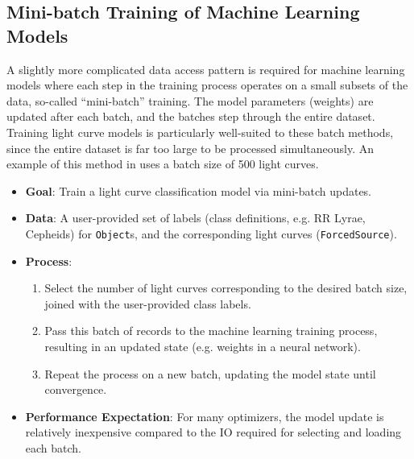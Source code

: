 \documentclass[DM,authoryear,toc]{lsstdoc}
\begin{document}
\subsection{Mini-batch Training of Machine Learning Models}

A slightly more complicated data access pattern is required for machine learning
models where each step in the training process operates on a small subsets of
the data, so-called ``mini-batch'' training. The model parameters (weights) are
updated after each batch, and the batches step through the entire dataset.
Training light curve models is
particularly well-suited to these batch methods, since the entire dataset is far
too large to be processed simultaneously. An example of this method in
\citet{2018NatAs...2..151N} uses a batch size of 500 light curves.

\begin{itemize}
  \item \textbf{Goal}: Train a light curve classification model via mini-batch updates.
  \item \textbf{Data}: A user-provided set of labels (class definitions, e.g. RR
  Lyrae, Cepheids) for \texttt{Object}s, and the corresponding light curves
  (\texttt{ForcedSource}).
  \item \textbf{Process}:
  \begin{enumerate}
    \item Select the number of light curves corresponding to the desired batch
    size, joined with the user-provided class labels.
    \item Pass this batch of records to the machine learning training process,
    resulting in an updated state (e.g. weights in a neural network).
    \item Repeat the process on a new batch, updating the model state until convergence.
  \end{enumerate}
  \item \textbf{Performance Expectation}: For many optimizers, the model update
  is relatively inexpensive compared to the IO required for selecting and
  loading each batch.
\end{itemize}


\end{document}

